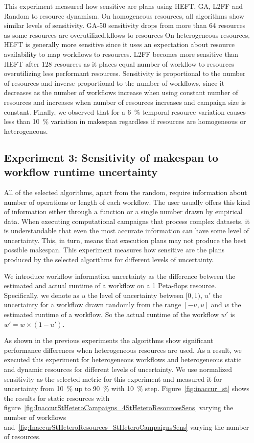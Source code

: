 This experiment measured how sensitive are plans using HEFT, GA, L2FF and Random to resource dynamism.
On homogeneous resources, all algorithms show similar levels of sensitivity.
GA-50 sensitivity drops from more than 64 resources as some resources are overutilized.kflows to resources
On heterogeneous resources, HEFT is generally more sensitive since it uses an expectation about resource availability to map workflows to resources.
L2FF becomes more sensitive than HEFT after 128 resources as it places equal number of workflow to resources overutilizing less performant resources.
Sensitivity is proportional to the number of resources and inverse proportional to the number of workflows, since it decreases as the number of workflows increase when using constant number of resources and increases when number of resources increases and campaign size is constant.
Finally, we observed that for a 6~\% temporal resource variation causes less than 10~\% variation in makespan regardless if resources are homogeneous or heterogeneous.


\subsection{Experiment 3: Sensitivity of makespan to workflow runtime uncertainty}

All of the selected algorithms, apart from the random, require information about number of operations or length of each workflow.
The user usually offers this kind of information either through a function or a single number drawn by empirical data.
When executing computational campaigns that process complex datasets, it is understandable that even the most accurate information can have some level of uncertainty.
This, in turn, means that execution plans may not produce the best possible makespan.
This experiment measures how sensitive are the plans produced by the selected algorithms for different levels of uncertainty.

We introduce workflow information uncertainty as the difference between the estimated and actual runtime of a workflow on a 1 Peta-flops resource.
Specifically, we denote as $u$ the level of uncertainty between $[0,1)$, $u'$ the uncertainty for a workflow drawn randomly from the range $[-u,u]$ and $w$ the estimated runtime of a workflow.
So the actual runtime of the workflow $w'$ is $ w' = w \times (1-u')$.

As shown in the previous experiments the algorithms show significant performance differences when heterogeneous resources are used.
As a result, we executed this experiment for heterogeneous workflows and heterogeneous static and dynamic resources for different levels of uncertainty.
We use normalized sensitivity as the selected metric for this experiment and measured it for uncertainty from 10~\% up to 90~\% with 10~\% step.
Figure~\ref{fig:inaccur_st} shows the results for static resources with figure~\ref{fig:InaccurStHeteroCampaigns_4StHeteroResourcesSens} varying the number of workflows and~\ref{fig:InaccurStHeteroResources_StHeteroCampaignsSens} varying the number of resources.

